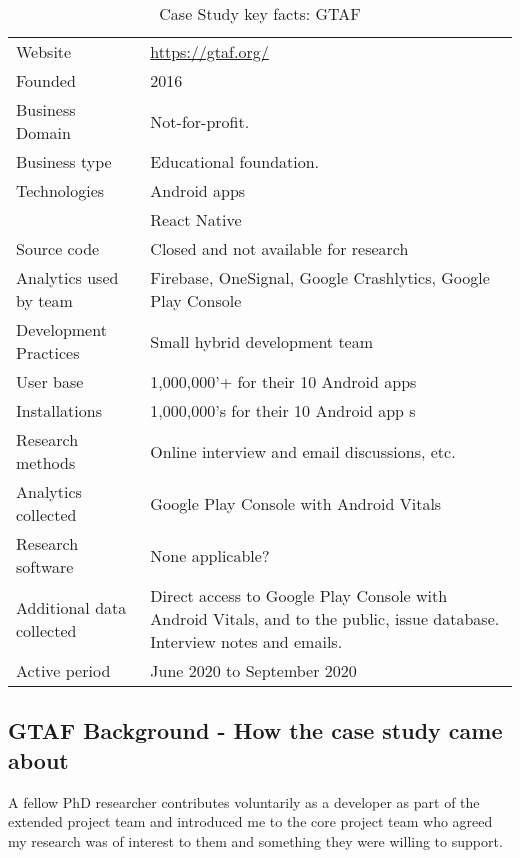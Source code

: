 {\renewcommand{\arraystretch}{0.8}%
\begin{table}[htbp!]
    \centering
    \small
    \setlength{\tabcolsep}{1pt}
    \begin{tabular}{lp{9cm}}
       \toprule
       Website &\url{https://gtaf.org/} \\
       Founded & 2016 \\
       Business Domain & Not-for-profit.  \\
       Business type & Educational foundation. \\
       Technologies  & Android apps\footnotemark \\
       & React Native \\
       Source code  & Closed and not available for research \\
       Analytics used by team & Firebase, OneSignal, Google Crashlytics, Google Play Console \\
       Development Practices & Small hybrid development team \\
       \midrule
       User base & 1,000,000'+ for their 10 Android apps \\
       Installations & 1,000,000's for their 10 Android app s\\
       \midrule
       Research methods &Online interview and email discussions, etc. \\
       Analytics collected &Google Play Console with Android Vitals \\
       Research software & None applicable? \\
       Additional data collected &Direct access to Google Play Console with Android Vitals, and to the public, issue database. Interview notes and emails. \\
       Active period & June 2020 to September 2020 \\
       \bottomrule
    \end{tabular}
    \caption{Case Study key facts: GTAF}
    \label{tab:blank_case_study_anaytics_overview}
\end{table}
}


\subsection{GTAF Background - How the case study came about}
A fellow PhD researcher contributes voluntarily as a developer as part of the extended project team and introduced me to the core project team who agreed my research was of interest to them and something they were willing to support.


